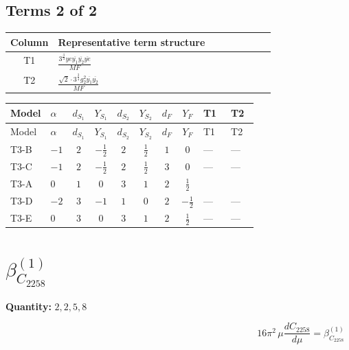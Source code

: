 \documentclass[8pt]{article}
\begin{document}
\begin{landscape}
\subsection*{Terms 2 of 2}
\begin{center}
\begin{tabular}{@{}c >{\raggedright\arraybackslash}p{0.82\linewidth}@{}}
\toprule
Column & Representative term structure \\
\midrule
T1 & \(\displaystyle \frac{3^{\frac{3}{4}} ye \overline{y_{1}} \overline{y_{2}} \overline{ye}}{MF}\) \\
\midrule
T2 & \(\displaystyle \frac{\sqrt{2} \cdot 3^{\frac{3}{4}} g_{2}^{2} \overline{y_{1}} \overline{y_{2}}}{MF}\) \\
\midrule
\bottomrule
\end{tabular}
\end{center}
\smallskip
\tiny
\begin{longtable}{@{}llcccccc >{\raggedright\arraybackslash}p{0.21\linewidth} >{\raggedright\arraybackslash}p{0.21\linewidth}@{}}
\toprule
Model & $\alpha$ & $d_{S_1}$ & $Y_{S_1}$ & $d_{S_2}$ & $Y_{S_2}$ & $d_F$ & $Y_F$ & T1 & T2 \\
\midrule
\endfirsthead
\toprule
Model & $\alpha$ & $d_{S_1}$ & $Y_{S_1}$ & $d_{S_2}$ & $Y_{S_2}$ & $d_F$ & $Y_F$ & T1 & T2 \\
\midrule
\endhead
T3-B & $-1$ & $2$ & $-\frac{1}{2}$ & $2$ & $\frac{1}{2}$ & $1$ & $0$ & --- & --- \\
\midrule
T3-C & $-1$ & $2$ & $-\frac{1}{2}$ & $2$ & $\frac{1}{2}$ & $3$ & $0$ & --- & --- \\
\midrule
T3-A & $0$ & $1$ & $0$ & $3$ & $1$ & $2$ & $\frac{1}{2}$ & \scriptsize\adjustbox{max width=\linewidth}{$\begin{gathered} - \frac{3^{\frac{3}{4}} ye \overline{y_{1}} \overline{y_{2}} \overline{ye}}{12 MF}\end{gathered}$} & \scriptsize\adjustbox{max width=\linewidth}{$\begin{gathered} \frac{\sqrt{2} \cdot 3^{\frac{3}{4}} g_{2}^{2} \overline{y_{1}} \overline{y_{2}}}{3 MF}\end{gathered}$} \\
\midrule
T3-D & $-2$ & $3$ & $-1$ & $1$ & $0$ & $2$ & $-\frac{1}{2}$ & --- & --- \\
\midrule
T3-E & $0$ & $3$ & $0$ & $3$ & $1$ & $2$ & $\frac{1}{2}$ & --- & --- \\
\midrule
\bottomrule
\end{longtable}
\clearpage
\section*{$\beta_{C_{2258}}^{(1)}$}
\noindent\textbf{Quantity: }$\mathrm{2,2,5,8}$\par\smallskip
\[16\pi^2\,\mu\frac{d C_{2258}}{d\mu}=\beta_{C_{2258}}^{(1)}\]

\end{landscape}
\end{document}
